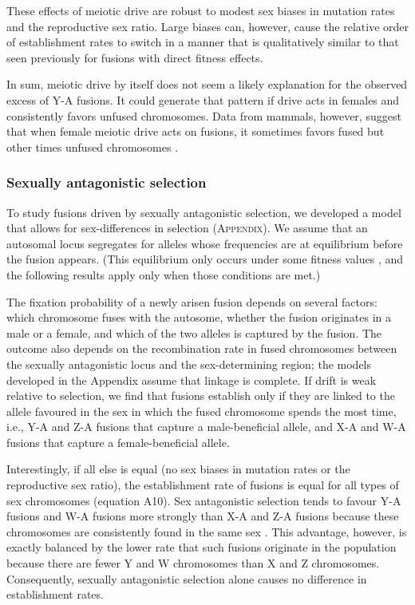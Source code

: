 These effects of meiotic drive are robust to modest sex biases in mutation rates and the reproductive sex ratio. Large biases can, however, cause the relative order of establishment rates to switch in a manner that is qualitatively similar to that seen previously for fusions with direct fitness effects.

In sum, meiotic drive by itself does not seem a likely explanation for the observed excess of Y-A fusions. It could generate that pattern if drive acts in females and consistently favors unfused chromosomes. Data from mammals, however, suggest that when female meiotic drive acts on fusions, it sometimes favors fused but other times unfused chromosomes \citep{Pando2001a, Pando2001b}.

\subsubsection{Sexually antagonistic selection} 

To study fusions driven by sexually antagonistic selection, we developed a model that allows for sex-differences in selection (\textsc{Appendix}). We assume that an autosomal locus segregates for alleles whose frequencies are at equilibrium before the fusion appears. (This equilibrium only occurs under some fitness values \citep{Clark1988}, and the following results apply only when those conditions are met.)

The fixation probability of a newly arisen fusion depends on several factors: which chromosome fuses with the autosome, whether the fusion originates in a male or a female, and which of the two alleles is captured by the fusion. The outcome also depends on the recombination rate in fused chromosomes between the sexually antagonistic locus and the sex-determining region; the models developed in the Appendix assume that linkage is complete. If drift is weak relative to selection, we find that fusions establish only if they are linked to the allele favoured in the sex in which the fused chromosome spends the most time, i.e., Y-A and Z-A fusions that capture a male-beneficial allele, and X-A and W-A fusions that capture a female-beneficial allele. 

Interestingly, if all else is equal (no sex biases in mutation rates or the reproductive sex ratio), the establishment rate of fusions is equal for all types of sex chromosomes (equation A10). Sex antagonistic selection tends to favour Y-A fusions and W-A fusions more strongly than X-A and Z-A fusions because these chromosomes are consistently found in the same sex \citep{Charlesworth1980}. This advantage, however, is exactly balanced by the lower rate that such fusions originate in the population because there are fewer Y and W chromosomes than X and Z chromosomes. Consequently, sexually antagonistic selection alone causes no difference in establishment rates.

